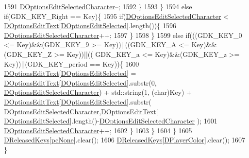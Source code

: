 \begin{DoxyCode}
1591                    \hyperlink{classCApplicationData_a921d69021fc61e51d12d8a26a5ac1a89}{DOptionsEditSelectedCharacter}--; 
1592                 \}
1593             \}
1594             \textcolor{keywordflow}{else} \textcolor{keywordflow}{if}(GDK\_KEY\_Right == Key)\{
1595                 \textcolor{keywordflow}{if}(\hyperlink{classCApplicationData_a921d69021fc61e51d12d8a26a5ac1a89}{DOptionsEditSelectedCharacter} < 
      \hyperlink{classCApplicationData_a7044dc34cbd9d6776e8ef79eb12b5ce4}{DOptionsEditText}[\hyperlink{classCApplicationData_aee4aa5eb5b89b86eb2648d0f9c7358f9}{DOptionsEditSelected}].length())\{
1596                    \hyperlink{classCApplicationData_a921d69021fc61e51d12d8a26a5ac1a89}{DOptionsEditSelectedCharacter}++; 
1597                 \}
1598             \}
1599             \textcolor{keywordflow}{else} \textcolor{keywordflow}{if}(((GDK\_KEY\_0 <= Key)&&(GDK\_KEY\_9 >= Key))||((GDK\_KEY\_A <= Key)&&(GDK\_KEY\_Z >= Key))||((
      GDK\_KEY\_a <= Key)&&(GDK\_KEY\_z >= Key))||(GDK\_KEY\_period == Key))\{
1600                 \hyperlink{classCApplicationData_a7044dc34cbd9d6776e8ef79eb12b5ce4}{DOptionsEditText}[\hyperlink{classCApplicationData_aee4aa5eb5b89b86eb2648d0f9c7358f9}{DOptionsEditSelected}] = 
      \hyperlink{classCApplicationData_a7044dc34cbd9d6776e8ef79eb12b5ce4}{DOptionsEditText}[\hyperlink{classCApplicationData_aee4aa5eb5b89b86eb2648d0f9c7358f9}{DOptionsEditSelected}].substr(0,
      \hyperlink{classCApplicationData_a921d69021fc61e51d12d8a26a5ac1a89}{DOptionsEditSelectedCharacter}) + std::string(1, (\textcolor{keywordtype}{char})Key) + 
      \hyperlink{classCApplicationData_a7044dc34cbd9d6776e8ef79eb12b5ce4}{DOptionsEditText}[\hyperlink{classCApplicationData_aee4aa5eb5b89b86eb2648d0f9c7358f9}{DOptionsEditSelected}].substr(
      \hyperlink{classCApplicationData_a921d69021fc61e51d12d8a26a5ac1a89}{DOptionsEditSelectedCharacter},\hyperlink{classCApplicationData_a7044dc34cbd9d6776e8ef79eb12b5ce4}{DOptionsEditText}[
      \hyperlink{classCApplicationData_aee4aa5eb5b89b86eb2648d0f9c7358f9}{DOptionsEditSelected}].length()-\hyperlink{classCApplicationData_a921d69021fc61e51d12d8a26a5ac1a89}{DOptionsEditSelectedCharacter}
      );
1601                 \hyperlink{classCApplicationData_a921d69021fc61e51d12d8a26a5ac1a89}{DOptionsEditSelectedCharacter}++;
1602             \}
1603         \}
1604     \}
1605     \hyperlink{classCApplicationData_adcef59167cadd8ee516884a7c0df08f6}{DReleasedKeys}[\hyperlink{GameDataTypes_8h_aafb0ca75933357ff28a6d7efbdd7602fa88767aa8e02c7b3192bbab4127b3d729}{pcNone}].clear();
1606     \hyperlink{classCApplicationData_adcef59167cadd8ee516884a7c0df08f6}{DReleasedKeys}[\hyperlink{classCApplicationData_a53550939b20cba70570f113e4d1c5d02}{DPlayerColor}].clear();
1607 \}                   
\end{DoxyCode}
